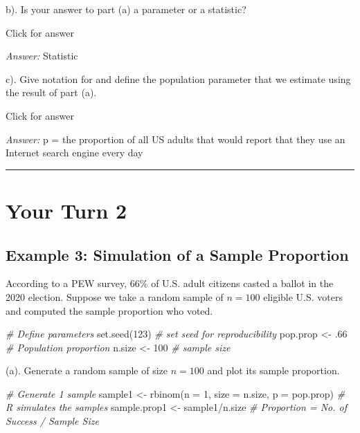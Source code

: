 \documentclass[
]{book}
\newenvironment{Shaded}{\begin{snugshade}}{\end{snugshade}}
\newcommand{\AttributeTok}[1]{\textcolor[rgb]{0.77,0.63,0.00}{#1}}
\newcommand{\CommentTok}[1]{\textcolor[rgb]{0.56,0.35,0.01}{\textit{#1}}}
\newcommand{\DecValTok}[1]{\textcolor[rgb]{0.00,0.00,0.81}{#1}}
\newcommand{\FunctionTok}[1]{\textcolor[rgb]{0.00,0.00,0.00}{#1}}
\newcommand{\NormalTok}[1]{#1}
\newcommand{\OtherTok}[1]{\textcolor[rgb]{0.56,0.35,0.01}{#1}}
\newcommand{\SpecialCharTok}[1]{\textcolor[rgb]{0.00,0.00,0.00}{#1}}
\begin{document}
b). Is your answer to part (a) a parameter or a statistic?

Click for answer

\emph{Answer:} Statistic

c). Give notation for and define the population parameter that we estimate using the result of part (a).

Click for answer

\emph{Answer:} p = the proportion of all US adults that would report that they use an Internet search engine every day

\begin{center}\rule{0.5\linewidth}{0.5pt}\end{center}

\hypertarget{your-turn-2-5}{%
\section{Your Turn 2}\label{your-turn-2-5}}

\hypertarget{example-3-simulation-of-a-sample-proportion}{%
\subsection{Example 3: Simulation of a Sample Proportion}\label{example-3-simulation-of-a-sample-proportion}}

According to a PEW survey, \(66\%\) of U.S. adult citizens casted a ballot in the 2020 election. Suppose we take a random sample of \(n=100\) eligible U.S. voters and computed the sample proportion who voted.

\begin{Shaded}
\begin{Highlighting}[]
\CommentTok{\# Define parameters}
\FunctionTok{set.seed}\NormalTok{(}\DecValTok{123}\NormalTok{) }\CommentTok{\# set seed for reproducibility}
\NormalTok{pop.prop }\OtherTok{\textless{}{-}}\NormalTok{ .}\DecValTok{66} \CommentTok{\# Population proportion}
\NormalTok{n.size }\OtherTok{\textless{}{-}} \DecValTok{100}  \CommentTok{\# sample size}
\end{Highlighting}
\end{Shaded}

(a). Generate a random sample of size \(n= 100\) and plot its sample proportion.

\begin{Shaded}
\begin{Highlighting}[]
\CommentTok{\# Generate 1 sample}
\NormalTok{sample1 }\OtherTok{\textless{}{-}} \FunctionTok{rbinom}\NormalTok{(}\AttributeTok{n =} \DecValTok{1}\NormalTok{, }\AttributeTok{size =}\NormalTok{ n.size, }\AttributeTok{p =}\NormalTok{ pop.prop) }\CommentTok{\# R simulates the samples}
\NormalTok{sample.prop1 }\OtherTok{\textless{}{-}}\NormalTok{ sample1}\SpecialCharTok{/}\NormalTok{n.size }\CommentTok{\#  Proportion = No. of Success / Sample Size}
\end{Highlighting}
\end{Shaded}
\end{document}

